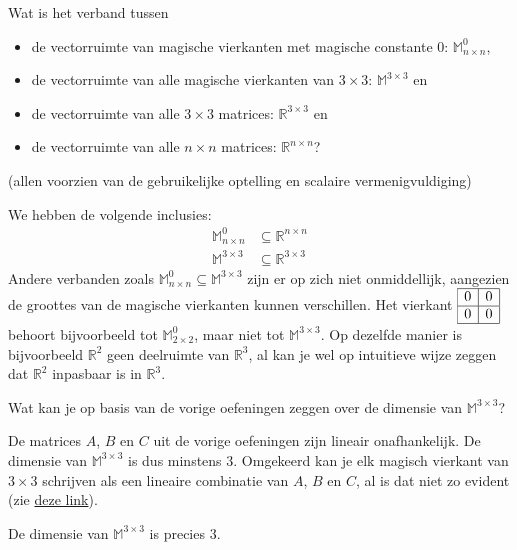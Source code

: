 \documentclass{ximera}
\begin{document}
\begin{exercise}
    Wat is het verband tussen
    \begin{itemize}
        \item de vectorruimte van magische vierkanten met magische constante \(0\): \(\mathbb{M}_{n\times n}^0\),
        \item de vectorruimte van alle magische vierkanten van \(3 \times 3\): \(\mathbb{M}^{3 \times 3}\) en
        \item de vectorruimte van alle \(3 \times 3\) matrices: \(\mathbb{R}^{3 \times 3}\) en
        \item de vectorruimte van alle \(n \times n\) matrices: \(\mathbb{R}^{n \times n}\)?
    \end{itemize}
    (allen voorzien van de gebruikelijke optelling en scalaire vermenigvuldiging)
    \begin{oplossing}
        We hebben de volgende inclusies:
        \begin{align*}
            \mathbb{M}_{n\times n}^0 &\subseteq \mathbb{R}^{n \times n}\\
            \mathbb{M}^{3 \times 3} &\subseteq \mathbb{R}^{3 \times 3}
        \end{align*}
        Andere verbanden zoals \(\mathbb{M}_{n\times n}^0 \subseteq \mathbb{M}^{3 \times 3}\) zijn er op zich niet onmiddellijk, aangezien de groottes van de magische vierkanten kunnen verschillen.
        Het vierkant \(
        \begin{array}{|c|c|}
        \hline
        0 & 0 \\
        \hline
        0 & 0 \\
        \hline
        \end{array}
        \)
        behoort bijvoorbeeld tot \(\mathbb{M}_{2\times 2}^0\), maar niet tot \(\mathbb{M}^{3 \times 3}\).
        Op dezelfde manier is bijvoorbeeld \(\mathbb{R}^2\) geen deelruimte van \(\mathbb{R}^{3}\), al kan je wel op intuitieve wijze zeggen dat \(\mathbb{R}^2\) inpasbaar is in \(\mathbb{R}^{3}\).
    \end{oplossing}
\end{exercise}

\begin{exercise}
    Wat kan je op basis van de vorige oefeningen zeggen over de dimensie van \(\mathbb{M}^{3 \times 3}\)?
    \begin{oplossing}
        De matrices \(A\), \(B\) en \(C\) uit de vorige oefeningen zijn lineair onafhankelijk.
        De dimensie van \(\mathbb{M}^{3 \times 3}\) is dus minstens \(3\).
        Omgekeerd kan je elk magisch vierkant van \(3 \times 3\) schrijven als een lineaire combinatie van \(A\), \(B\) en \(C\), al is dat niet zo evident (zie \hyperlink{https://math.stackexchange.com/questions/2137182/showing-a-set-of-matrices-is-a-basis-of-all-3x3-magic-squares}{deze link}).

        De dimensie van \(\mathbb{M}^{3 \times 3}\) is precies \(3\).
    \end{oplossing}
\end{exercise}

\end{document}

